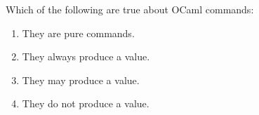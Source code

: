 \question Which of the following are true about OCaml commands:
\begin{enumerate}
\item They are pure commands.
\item They always produce a value.
\item They may produce a value.
\item They do not produce a value.
\end{enumerate}